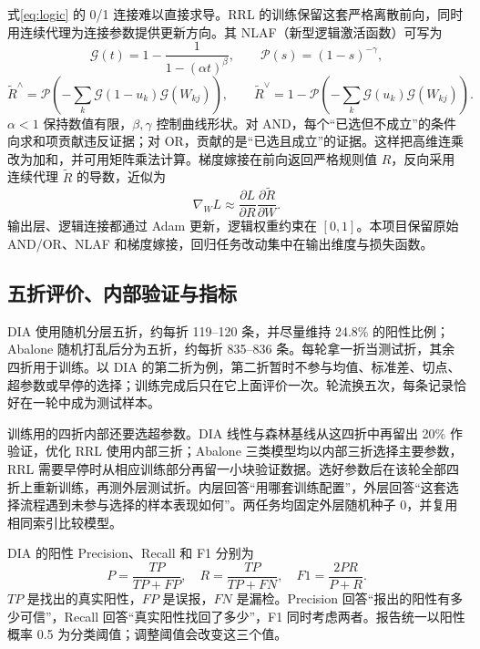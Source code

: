 \documentclass[UTF8,a4paper,11pt]{ctexart}
\begin{document}
式\eqref{eq:logic} 的 0/1 连接难以直接求导。RRL 的训练保留这套严格离散前向，同时用连续代理为连接参数提供更新方向。其 NLAF（新型逻辑激活函数）可写为
\begin{equation}
\mathcal G(t)=1-\frac{1}{1-(\alpha t)^\beta},\qquad
\mathcal P(s)=(1-s)^{-\gamma},
\end{equation}
\begin{equation}
\widetilde R^{\land}=\mathcal P\!\left(-\sum_k\mathcal G(1-u_k)\mathcal G(W_{kj})\right),\qquad
\widetilde R^{\lor}=1-\mathcal P\!\left(-\sum_k\mathcal G(u_k)\mathcal G(W_{kj})\right).
\label{eq:nlaf}
\end{equation}
$\alpha<1$ 保持数值有限，$\beta,\gamma$ 控制曲线形状。对 AND，每个“已选但不成立”的条件向求和项贡献违反证据；对 OR，贡献的是“已选且成立”的证据。这样把高维连乘改为加和，并可用矩阵乘法计算。梯度嫁接在前向返回严格规则值 $R$，反向采用连续代理 $\widetilde R$ 的导数，近似为
\begin{equation}
\nabla_W L\approx \frac{\partial L}{\partial R}
                    \frac{\partial\widetilde R}{\partial W}.
\label{eq:graft}
\end{equation}
输出层、逻辑连接都通过 Adam 更新，逻辑权重约束在 $[0,1]$。本项目保留原始 AND/OR、NLAF 和梯度嫁接，回归任务改动集中在输出维度与损失函数。

\subsection{五折评价、内部验证与指标}

DIA 使用随机分层五折，约每折 119--120 条，并尽量维持 24.8\% 的阳性比例；Abalone 随机打乱后分为五折，约每折 835--836 条。每轮拿一折当测试折，其余四折用于训练。以 DIA 的第二折为例，第二折暂时不参与均值、标准差、切点、超参数或早停的选择；训练完成后只在它上面评价一次。轮流换五次，每条记录恰好在一轮中成为测试样本。

训练用的四折内部还要选超参数。DIA 线性与森林基线从这四折中再留出 20\% 作验证，优化 RRL 使用内部三折；Abalone 三类模型均以内部三折选择主要参数，RRL 需要早停时从相应训练部分再留一小块验证数据。选好参数后在该轮全部四折上重新训练，再测外层测试折。内层回答“用哪套训练配置”，外层回答“这套选择流程遇到未参与选择的样本表现如何”。两任务均固定外层随机种子 0，并复用相同索引比较模型。

DIA 的阳性 Precision、Recall 和 F1 分别为
\begin{equation}
P=\frac{TP}{TP+FP},\quad R=\frac{TP}{TP+FN},\quad F1=\frac{2PR}{P+R}.
\label{eq:prf}
\end{equation}
$TP$ 是找出的真实阳性，$FP$ 是误报，$FN$ 是漏检。Precision 回答“报出的阳性有多少可信”，Recall 回答“真实阳性找回了多少”，F1 同时考虑两者。报告统一以阳性概率 0.5 为分类阈值；调整阈值会改变这三个值。
\end{document}
